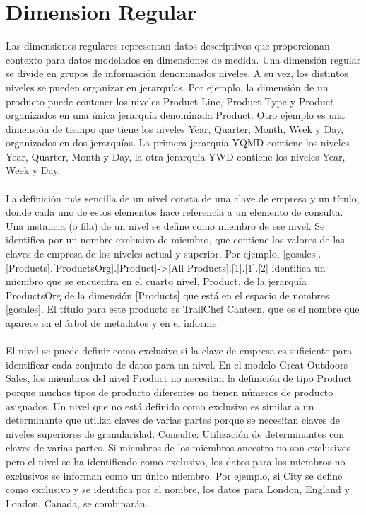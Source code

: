 \documentclass{article}
\begin{document}
\section{Dimension Regular }
Las dimensiones regulares representan datos descriptivos que proporcionan contexto para datos modelados en dimensiones de medida. Una dimensión regular se divide en grupos de información denominados niveles. A su vez, los distintos niveles se pueden organizar en jerarquías. Por ejemplo, la dimensión de un producto puede contener los niveles Product Line, Product Type y Product organizados en una única jerarquía denominada Product. Otro ejemplo es una dimensión de tiempo que tiene los niveles Year, Quarter, Month, Week y Day, organizados en dos jerarquías. La primera jerarquía YQMD contiene los niveles Year, Quarter, Month y Day, la otra jerarquía YWD contiene los niveles Year, Week y Day.
\\
\\
La definición más sencilla de un nivel consta de una clave de empresa y un título, donde cada uno de estos elementos hace referencia a un elemento de consulta. Una instancia (o fila) de un nivel se define como miembro de ese nivel. Se identifica por un nombre exclusivo de miembro, que contiene los valores de las claves de empresa de los niveles actual y superior. Por ejemplo, [gosales].[Products].[ProductsOrg].[Product]->[All Products].[1].[1].[2] identifica un miembro que se encuentra en el cuarto nivel, Product, de la jerarquía ProductsOrg de la dimensión [Products] que está en el espacio de nombres [gosales]. El título para este producto es TrailChef Canteen, que es el nombre que aparece en el árbol de metadatos y en el informe.
\\
\\
El nivel se puede definir como exclusivo si la clave de empresa es suficiente para identificar cada conjunto de datos para un nivel. En el modelo Great Outdoors Sales, los miembros del nivel Product no necesitan la definición de tipo Product porque muchos tipos de producto diferentes no tienen números de producto asignados. Un nivel que no está definido como exclusivo es similar a un determinante que utiliza claves de varias partes porque se necesitan claves de niveles superiores de granularidad. Consulte: Utilización de determinantes con claves de varias partes. Si miembros de los miembros ancestro no son exclusivos pero el nivel se ha identificado como exclusivo, los datos para los miembros no exclusivos se informan como un único miembro. Por ejemplo, si City se define como exclusivo y se identifica por el nombre, los datos para London, England y London, Canada, se combinarán.
\end{document}
